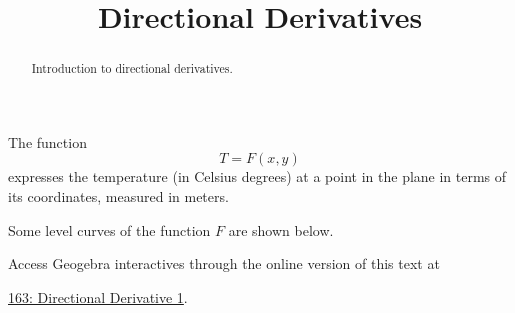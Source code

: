 \documentclass{ximera}
\title{Directional Derivatives}
\begin{document}
\begin{abstract}
Introduction to directional derivatives.
\end{abstract}
\maketitle



\begin{question}  \label{Qds54546bd}

The function 
\[
     T= F(x,y)
\]
expresses the temperature (in Celsius degrees) at a point in the plane in terms of its coordinates, measured in meters.

Some level curves of the function $F$ are shown below.

 
\begin{onlineOnly}
    \begin{center}
\end{center}
\end{onlineOnly}

Access Geogebra interactives through the online version of this text at
 
\href{https://www.geogebra.org/classic/cfkfwfpk}{163: Directional Derivative 1}.



\end{question}
\end{document}
